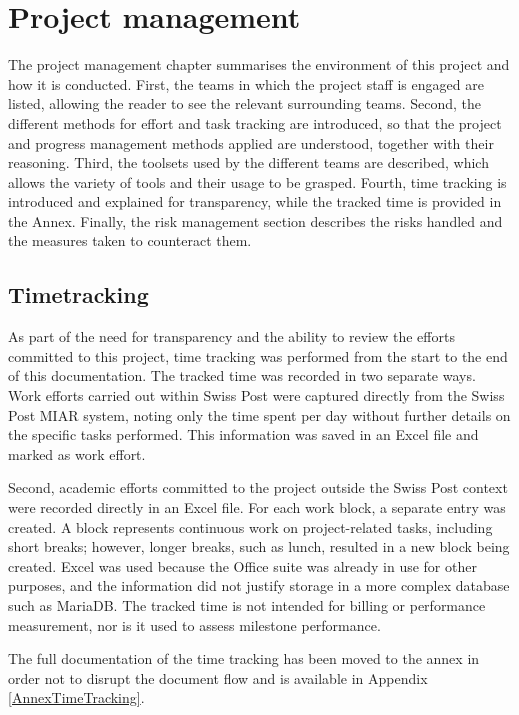 \chapter{Project management}

The project management chapter summarises the environment of this project and how it is conducted. First, the teams in which the project staff is engaged are listed, allowing the reader to see the relevant surrounding teams. Second, the different methods for effort and task tracking are introduced, so that the project and progress management methods applied are understood, together with their reasoning. Third, the toolsets used by the different teams are described, which allows the variety of tools and their usage to be grasped. Fourth, time tracking is introduced and explained for transparency, while the tracked time is provided in the Annex. Finally, the risk management section describes the risks handled and the measures taken to counteract them.




\section{Timetracking}
As part of the need for transparency and the ability to review the efforts committed to this project, time tracking was performed from the start to the end of this documentation. The tracked time was recorded in two separate ways. Work efforts carried out within Swiss Post were captured directly from the Swiss Post \gls{MIAR} system, noting only the time spent per day without further details on the specific tasks performed. This information was saved in an Excel file and marked as work effort.

Second, academic efforts committed to the project outside the Swiss Post context were recorded directly in an Excel file. For each work block, a separate entry was created. A block represents continuous work on project-related tasks, including short breaks; however, longer breaks, such as lunch, resulted in a new block being created. Excel was used because the Office suite was already in use for other purposes, and the information did not justify storage in a more complex database such as MariaDB. The tracked time is not intended for billing or performance measurement, nor is it used to assess milestone performance.

The full documentation of the time tracking has been moved to the annex in order not to disrupt the document flow and is available in Appendix \ref{AnnexTimeTracking}.


